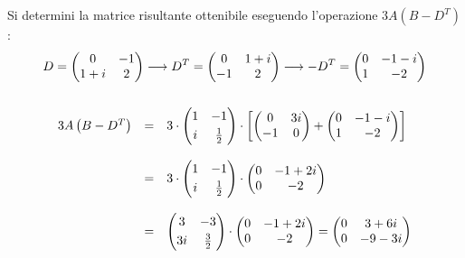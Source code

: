 \documentclass[a4paper]{article}
\makeatletter
\newenvironment{rowequmat}[1]{\left(\array{@{}#1@{}}}{\endarray\right)}
\makeatother
\begin{document}
	Si determini la matrice risultante ottenibile eseguendo l'operazione $3A\left(B-D^{T}\right)$:
	\begin{gather*}
		D = \begin{rowequmat}{cc}
			0 	& -1 \\
			1+i & 2
		\end{rowequmat} \longrightarrow
		D^{T} = \begin{rowequmat}{cc}
			0 	& 1+i \\
			-1 	& 2
		\end{rowequmat} \longrightarrow
		-D^{T} = \begin{rowequmat}{cc}
			0 	& -1-i \\
			1 	& -2
		\end{rowequmat} \\
		\\
		\begin{array}{lll}
			3A\left(B-D^{T}\right) & = & 
			3\cdot\begin{rowequmat}{cc}
				1 & -1 \\ [0.3em]
				i & \frac{1}{2}
			\end{rowequmat} \cdot \left[
			\begin{rowequmat}{cc}
				0 & 3i \\
				-1 & 0
			\end{rowequmat} + \begin{rowequmat}{cc}
				0 	& -1-i \\
				1 	& -2
			\end{rowequmat}
			\right] \\
			\\
			&=& 3\cdot\begin{rowequmat}{cc}
				1 & -1 \\ [0.3em]
				i & \frac{1}{2}
			\end{rowequmat} \cdot \begin{rowequmat}{cc}
				0 & -1+2i \\
				0 & -2
			\end{rowequmat} \\
			\\
			&=& \begin{rowequmat}{cc}
				3 & -3 \\ [0.3em]
				3i & \frac{3}{2}
			\end{rowequmat} \cdot \begin{rowequmat}{cc}
				0 & -1+2i \\
				0 & -2
			\end{rowequmat} = \begin{rowequmat}{cc}
				0 & 3+6i \\
				0 & -9-3i
			\end{rowequmat}
		\end{array}
	\end{gather*}\newpage
	
\end{document}
